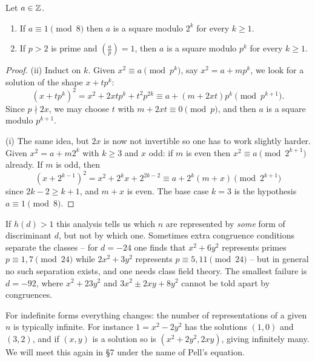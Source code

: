 \documentclass[a4paper]{scrartcl}
\begin{document}
\begin{lemma}\label{nt-lem:lifting}
	Let $a \in \mathbb{Z}$.
	\begin{enumerate}[label=(\roman*)]
		\item If $a \equiv 1 \pmod 8$ then $a$ is a square modulo $2^k$ for every $k \geq 1$.
		\item If $p > 2$ is prime and $\left( \frac ap \right) = 1$, then $a$ is a square modulo $p^k$ for every $k \geq 1$.
	\end{enumerate}
\end{lemma}
\begin{proof}
	(ii) Induct on $k$. Given $x^2 \equiv a \pmod{p^k}$, say $x^2 = a + mp^k$, we look for a solution of the shape $x + tp^k$:
	$$
	(x + tp^k)^2 = x^2 + 2xtp^k + t^2p^{2k} \equiv a + (m + 2xt)p^k \pmod{p^{k+1}}.
	$$
	Since $p \nmid 2x$, we may choose $t$ with $m + 2xt \equiv 0 \pmod p$, and then $a$ is a square modulo $p^{k+1}$.

	(i) The same idea, but $2x$ is now not invertible so one has to work slightly harder. Given $x^2 = a + m2^k$ with $k \geq 3$ and $x$ odd: if $m$ is even then $x^2 \equiv a \pmod{2^{k+1}}$ already. If $m$ is odd, then
	$$
	(x + 2^{k-1})^2 = x^2 + 2^kx + 2^{2k - 2} \equiv a + 2^k(m + x) \pmod{2^{k+1}}
	$$
	since $2k - 2 \geq k+1$, and $m + x$ is even. The base case $k = 3$ is the hypothesis $a \equiv 1 \pmod 8$.
\end{proof}

\begin{remark}
	If $h(d) > 1$ this analysis tells us which $n$ are represented by \emph{some} form of discriminant $d$, but not by which one. Sometimes extra congruence conditions separate the classes -- for $d = -24$ one finds that $x^2 + 6y^2$ represents primes $p \equiv 1, 7 \pmod{24}$ while $2x^2 + 3y^2$ represents $p \equiv 5, 11 \pmod{24}$ -- but in general no such separation exists, and one needs class field theory. The smallest failure is $d = -92$, where $x^2 + 23y^2$ and $3x^2 \pm 2xy + 8y^2$ cannot be told apart by congruences.
\end{remark}

\begin{remark}
	For indefinite forms everything changes: the number of representations of a given $n$ is typically infinite. For instance $1 = x^2 - 2y^2$ has the solutions $(1,0)$ and $(3,2)$, and if $(x,y)$ is a solution so is $(x^2 + 2y^2, 2xy)$, giving infinitely many. We will meet this again in \S7 under the name of Pell's equation.
\end{remark}
\end{document}
